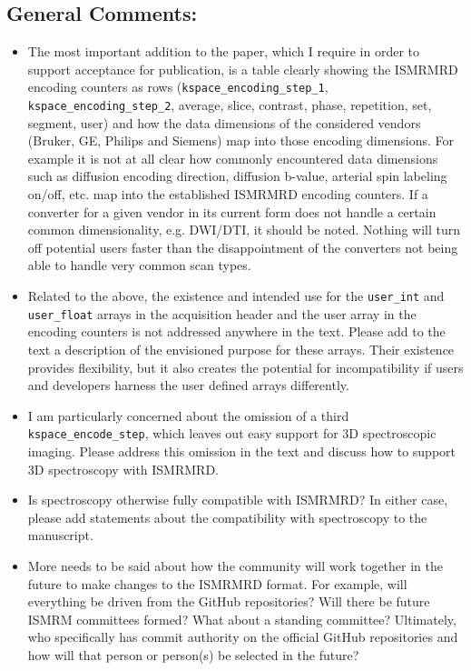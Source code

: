 \documentclass[12pt, draft]{article}
\makeatletter
\def\namedlabel#1#2{\begingroup#2\def\@currentlabel{#2}\phantomsection\label{#1}\endgroup}
\newcommand{\question}[1]{\item[\namedlabel{q#1}{#1}]}
\makeatother
\begin{document}
{\subsection*{General Comments:}
\begin{itemize}
\question{R2.1} The most important addition to the paper, which I require in order to support acceptance for publication, is a table clearly showing the ISMRMRD encoding counters as rows (\texttt{kspace\_encoding\_step\_1}, \texttt{kspace\_encoding\_step\_2}, average, slice, contrast, phase, repetition, set, segment, user) and how the data dimensions of the considered vendors (Bruker, GE, Philips and Siemens) map into those encoding dimensions. For example it is not at all clear how commonly encountered data dimensions such as diffusion encoding direction, diffusion b-value, arterial spin labeling on/off, etc. map into the established ISMRMRD encoding counters. If a converter for a given vendor in its current form does not handle a certain common dimensionality, e.g. DWI/DTI, it should be noted. Nothing will turn off potential users faster than the disappointment of the converters not being able to handle very common scan types.

\question{R2.2} Related to the above, the existence and intended use for the \texttt{user\_int} and \texttt{user\_float} arrays in the acquisition header and the user array in the encoding counters is not addressed anywhere in the text. Please add to the text a description of the envisioned purpose for these arrays. Their existence provides flexibility, but it also creates the potential for incompatibility if users and developers harness the user defined arrays differently.

\question{R2.3} I am particularly concerned about the omission of a third \texttt{kspace\_encode\_step}, which leaves out easy support for 3D spectroscopic imaging. Please address this omission in the text and discuss how to support 3D spectroscopy with ISMRMRD.

\question{R2.4} Is spectroscopy otherwise fully compatible with ISMRMRD? In either case, please add statements about the compatibility with spectroscopy to the manuscript.

\question{R2.5} More needs to be said about how the community will work together in the future to make changes to the ISMRMRD format. For example, will everything be driven from the GitHub repositories? Will there be future ISMRM committees formed? What about a standing committee? Ultimately, who specifically has commit authority on the official GitHub repositories and how will that person or person(s) be selected in the future?


\end{itemize}}
\end{document}
